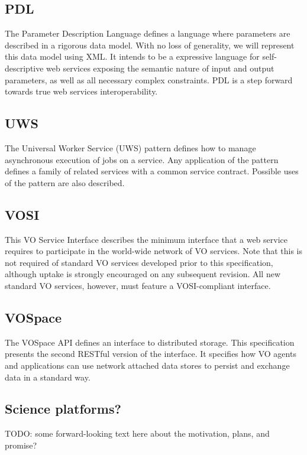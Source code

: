 \documentclass[11pt,a4paper]{ivoa}
\begin{document}
\subsection{PDL}

The Parameter Description Language defines a language where parameters are described in a 
rigorous data model. With no loss of generality, we will represent this data model using 
XML. It intends to be a expressive language for self-descriptive web services exposing 
the semantic nature of input and output parameters, as well as all necessary complex 
constraints. PDL is a step forward towards true web services interoperability. 
 
\subsection{UWS} 

The Universal Worker Service (UWS) pattern defines how to manage asynchronous execution 
of jobs on a service. Any application of the pattern defines a family of related services 
with a common service contract. Possible uses of the pattern are also described. 

\subsection{VOSI} 

This VO Service Interface describes the minimum interface that a web service requires to 
participate in the world-wide network of VO services. Note that this is not required of 
standard VO services developed prior to this specification, although uptake is strongly 
encouraged on any subsequent revision. All new standard VO services, however, must feature 
a VOSI-compliant interface. 

\subsection{VOSpace}

The VOSpace API defines an interface to distributed storage. This specification presents the 
second RESTful version of the interface. It specifies how VO agents and applications can 
use network attached data stores to persist and exchange data in a standard way. 

\subsection{Science platforms?}

TODO: some forward-looking text here about the motivation, plans, and promise?


\end{document}
